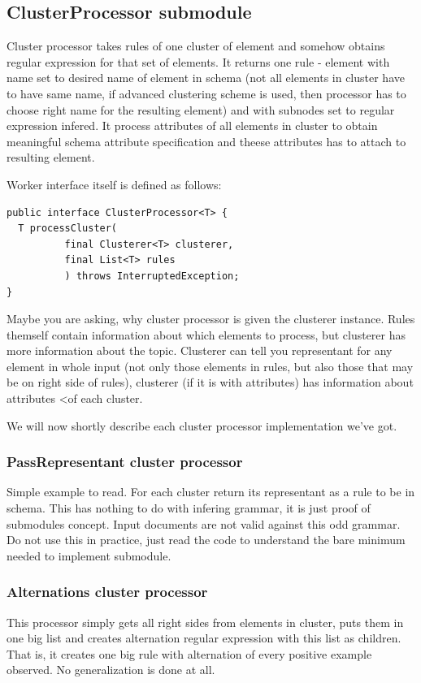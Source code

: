 \documentclass[a4paper,10pt,oneside]{article}
\begin{document}
\subsection{ClusterProcessor submodule}
Cluster processor takes rules of one cluster of element and somehow obtains regular expression for that set of elements. It returns one rule - element with name set to desired name of element in schema (not all elements in cluster have to have same name, if advanced clustering scheme is used, then processor has to choose right name for the resulting element) and with subnodes set to regular expression infered.
It process attributes of all elements in cluster to obtain meaningful schema attribute specification and theese attributes has to attach to resulting element.

Worker interface itself is defined as follows:
\begin{verbatim}
public interface ClusterProcessor<T> {
  T processCluster(
          final Clusterer<T> clusterer,
          final List<T> rules
          ) throws InterruptedException;
}
\end{verbatim}
Maybe you are asking, why cluster processor is given the clusterer instance.
Rules themself contain information about which elements to process, but clusterer has more information
about the topic.
Clusterer can tell you representant for any element in whole input (not only those elements in rules, but also those that may be on right side of rules), clusterer (if it is with attributes) has information about attributes <of each cluster.

We will now shortly describe each cluster processor implementation we've got.

\subsubsection{PassRepresentant cluster processor}
Simple example to read. For each cluster return its representant as a rule to be in schema.
This has nothing to do with infering grammar, it is just proof of submodules concept.
Input documents are not valid against this odd grammar.
Do not use this in practice, just read the code to understand the bare minimum needed to implement submodule.

\subsubsection{Alternations cluster processor}
This processor simply gets all right sides from elements in cluster, puts them in one big list and creates alternation regular expression with this list as children.
That is, it creates one big rule with alternation of every positive example observed.
No generalization is done at all.
\end{document}
